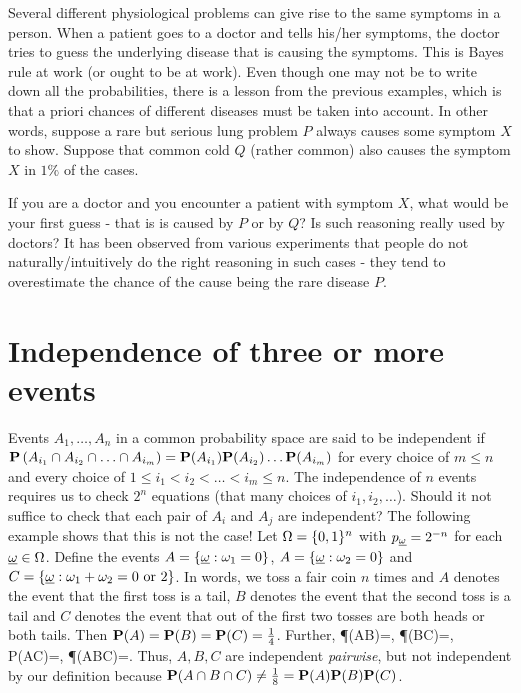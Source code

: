 \documentclass[preprint,  11pt]{amsart}
\def\omeg{\underline{\ome}}
\begin{document}
 Several different physiological problems can give rise to the same symptoms in a person. When a patient goes to a doctor and tells his/her symptoms, the doctor tries to guess the underlying disease that is causing the symptoms. This is Bayes rule at work (or ought to be at work). Even though one may not be to write down all the probabilities, there is a lesson from the previous examples, which is that a priori chances of different diseases must be taken into account. In other words, suppose a rare but serious lung problem $P$ always causes some symptom $X$ to show. Suppose that common  cold  $Q$ (rather common) also causes the symptom $X$ in $1\%$ of the cases. 

If you are a doctor and you encounter a patient with symptom $X$, what would be your first guess - that is is caused by $P$ or by $Q$? Is such reasoning really used by doctors? It has been observed from various experiments that people do not naturally/intuitively do the right reasoning in such cases - they tend to overestimate the chance of the cause being the rare disease $P$. 

\section{Independence of three or more events} 
\bdefn Events $A_{1},\ldots ,A_{n}$ in a common probability space are said to be independent if
$
\P\l(A_{i_{1}}\cap A_{i_{2}}\cap \ldots \cap A_{i_{m}}\r)=\P(A_{i_{1}})\P(A_{i_{2}})\ldots \P(A_{i_{m}})$ for every choice of $m\le n$ and every choice of $1\le i_{1}<i_{2}<\ldots <i_{m}\le n$.
\edefn
 The independence of $n$ events requires us to check $2^{n}$ equations (that many choices of $i_{1},i_{2},\ldots$). Should it not suffice to check that each pair of $A_{i}$ and $A_{j}$ are independent? The following example shows that this is not the case!
\beg Let $\Ome=\{0,1\}^{n}$ with $p_{\omeg}=2^{-n}$ for each $\omeg\in \Ome$. Define the events $A=\{\omeg\suchthat \ome_{1}=0\}$, $A=\{\omeg\suchthat \ome_{2}=0\}$ and $C=\{\omeg\suchthat \ome_{1}+\ome_{2}=0 \mb{ or }2\}$. In words, we toss a fair coin $n$ times and $A$ denotes the event that the first toss is a tail, $B$ denotes the event that the second toss is a tail and $C$ denotes the event that out of the first two tosses are both heads or both tails. Then $\P(A)=\P(B)=\P(C)=\frac{1}{4}$. Further, 
\ba
\P(A\cap B)=, \; \P(B\cap C)=, \; P(A\cap C)=, \; \P(A\cap B\cap C)=.
\ea
Thus,  $A,B,C$ are independent {\em pairwise}, but not independent by our definition because $\P(A\cap B\cap C)\not= \frac{1}{8}=\P(A)\P(B)\P(C)$.
\end{document}
